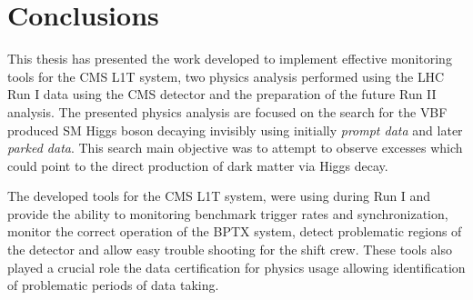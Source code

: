 \chapter{Conclusions}

This thesis has presented the work developed to implement effective monitoring tools for the \gls{CMS} \gls{L1T} system, two physics analysis performed using the \gls{LHC} Run I data using the \gls{CMS} detector and the preparation of the future Run II analysis. The presented physics analysis are focused on the search for the \gls{VBF} produced \gls{SM} Higgs boson decaying invisibly using initially \textit{prompt data} and later \textit{parked data}. This search main objective was to attempt to observe excesses which could point to the direct production of dark matter via Higgs decay.

The developed tools for the \gls{CMS} \gls{L1T} system, were using during Run I and provide the ability to monitoring benchmark trigger rates and synchronization, monitor the correct operation of the \gls{BPTX} system, detect problematic regions of the detector and allow easy trouble shooting for the shift crew. These tools also played a crucial role the data certification for physics usage allowing identification of problematic periods of data taking.

